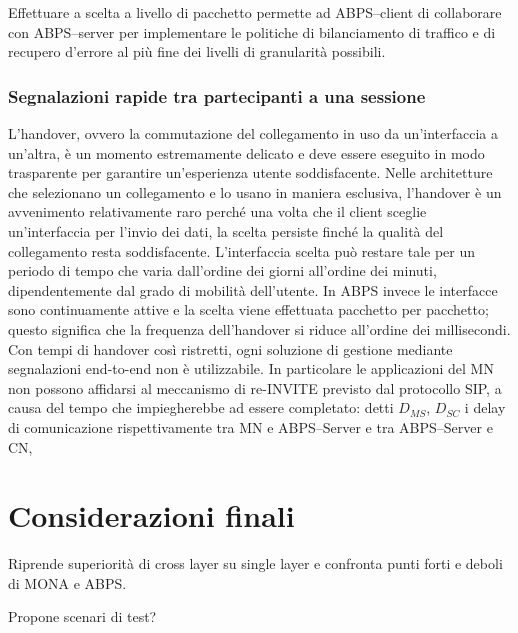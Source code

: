 \documentclass[12pt,a4paper,openright,twoside]{book}
\begin{document}
Effettuare a scelta a livello di pacchetto permette ad ABPS--client di
collaborare con ABPS--server per implementare le politiche di
bilanciamento di traffico e di recupero d'errore al più fine dei
livelli di granularità possibili.

\subsection{Segnalazioni rapide tra partecipanti a una sessione}
L'handover, ovvero la commutazione del collegamento in uso da
un'interfaccia a un'altra, è un momento estremamente delicato e deve
essere eseguito in modo trasparente per garantire un'esperienza utente
soddisfacente. Nelle architetture che selezionano un collegamento e lo
usano in maniera esclusiva, l'handover è un avvenimento relativamente
raro perché una volta che il client sceglie un'interfaccia per l'invio
dei dati, la scelta persiste finché la qualità del collegamento resta
soddisfacente. L'interfaccia scelta può restare tale per un periodo di
tempo che varia dall'ordine dei giorni all'ordine dei minuti,
dipendentemente dal grado di mobilità dell'utente. In ABPS invece le
interfacce sono continuamente attive e la scelta viene effettuata
pacchetto per pacchetto; questo significa che la frequenza
dell'handover si riduce all'ordine dei millisecondi. Con tempi di
handover così ristretti, ogni soluzione di gestione mediante
segnalazioni end-to-end non è utilizzabile. In particolare le
applicazioni del MN non possono affidarsi al meccanismo di re-INVITE
previsto dal protocollo SIP, a causa del tempo che impiegherebbe ad
essere completato: detti $D_{MS}$, $D_{SC}$ i delay di comunicazione
rispettivamente tra MN e ABPS--Server e tra ABPS--Server e CN,


\clearpage{\pagestyle{empty}\cleardoublepage}


\chapter{Considerazioni finali}
Riprende superiorità di cross layer su single layer e confronta punti
forti e deboli di MONA e ABPS.

Propone scenari di test?

\clearpage{\pagestyle{empty}\cleardoublepage}


\end{document}
